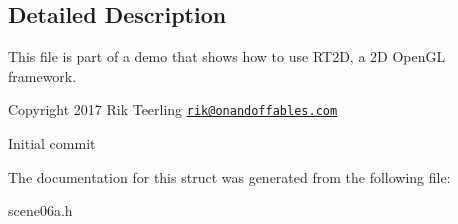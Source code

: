 \subsection{Detailed Description}
This file is part of a demo that shows how to use R\+T2D, a 2D Open\+GL framework.


\begin{DoxyItemize}
\item Copyright 2017 Rik Teerling \href{mailto:rik@onandoffables.com}{\tt rik@onandoffables.\+com}
\begin{DoxyItemize}
\item Initial commit 
\end{DoxyItemize}
\end{DoxyItemize}

The documentation for this struct was generated from the following file\+:\begin{DoxyCompactItemize}
\item 
scene06a.\+h\end{DoxyCompactItemize}
